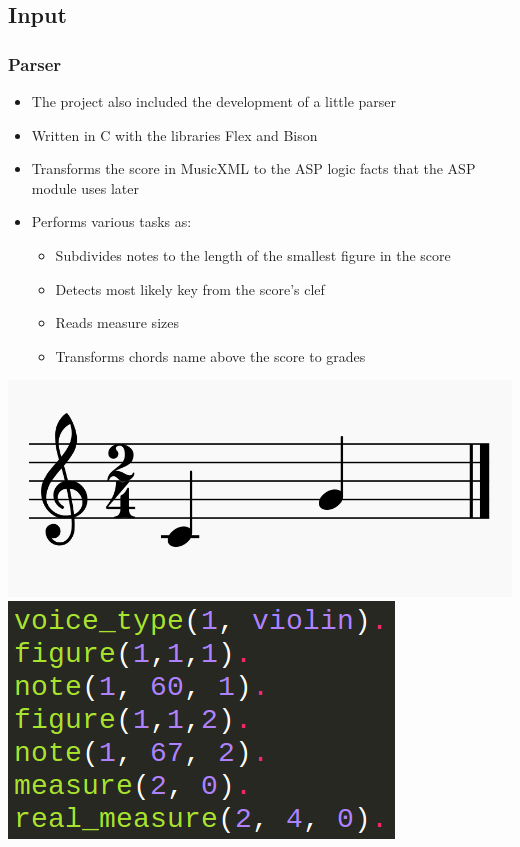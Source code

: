 \documentclass[english]{beamer}
\begin{document}
\subsection{Input}
	\begin{frame}
	\frametitle{Parser}
		\begin{itemize}
			\item The project also included the development of a little parser
			\item Written in C with the libraries Flex and Bison
			\item Transforms the score in MusicXML to the ASP logic facts that the ASP module uses later
			\item Performs various tasks as:
				\begin{itemize}
					\item Subdivides notes to the length of the smallest figure in the score
					\item Detects most likely key from the score's clef
					\item Reads measure sizes
					\item Transforms chords name above the score to grades
				\end{itemize}
		\end{itemize}
				\begin{center}
						\includegraphics[width=0.39\linewidth]{imagenes/example_notes.png}
						\includegraphics[width=0.39\linewidth]{imagenes/logic_facts_score.png}
				\end{center}
	\end{frame}
\end{document}
